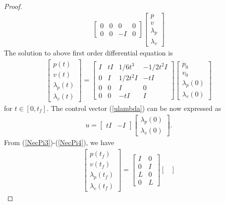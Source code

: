 \documentclass[12pt,draftcls,onecolumn]{IEEEtran}  %
\begin{document}
{\begin{proof}
\begin{align*}
\begin{bmatrix}
0&0&0&0\\
0&0&-I&0
\end{bmatrix}\begin{bmatrix}
p\\
v\\
\lambda_{p}\\
\lambda_{v}
\end{bmatrix}
\end{align*}
The solution to above first order differential equation is
\begin{align}
\begin{bmatrix}
p(t)\\
v(t)\\
\lambda_{p}(t)\\
\lambda_v(t)
\end{bmatrix}=\begin{bmatrix}
I&t I&1/6t^3&-1/2t^2I\\
0&I&1/2t^2I&-t I\\
0&0&I&0\\
0&0&-t I&I
\end{bmatrix}\begin{bmatrix}
p_0\\
v_0\\
\lambda_{p}(0)\\
\lambda_{v}(0)
\end{bmatrix}\label{twopointODE}
\end{align}
for $t\in[0,t_f]$. The control vector (\ref{ulambda}) can be now expressed as
\begin{align}
u=\begin{bmatrix}
tI& -I
\end{bmatrix}\begin{bmatrix}
\lambda_{p}(0)\\
\lambda_{v}(0)
\end{bmatrix}. \label{ulamdapv}
\end{align}
From (\ref{NecPi3})-(\ref{NecPi4}), we have
\begin{align}
\begin{bmatrix}
p(t_f)\\
v(t_f)\\
\lambda_{p}(t_f)\\
\lambda_v(t_f)
\end{bmatrix}=\begin{bmatrix}
I&0\\
0&I\\
L&0\\
0&L
\end{bmatrix}\begin{bmatrix}

\end{bmatrix}
\end{align}
\end{proof}}
\end{document}
